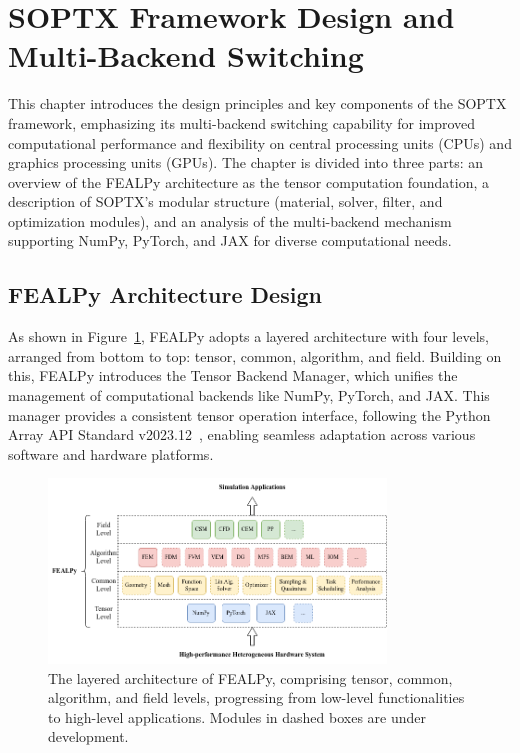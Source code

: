 \documentclass[mathpazo]{cicp}
\begin{document}
\section{SOPTX Framework Design and Multi-Backend Switching}
This chapter introduces the design principles and key components of the SOPTX framework, emphasizing its multi-backend switching capability for improved computational performance and flexibility on central processing units (CPUs) and graphics processing units (GPUs). The chapter is divided into three parts: an overview of the FEALPy architecture as the tensor computation foundation, a description of SOPTX’s modular structure (material, solver, filter, and optimization modules), and an analysis of the multi-backend mechanism supporting NumPy, PyTorch, and JAX for diverse computational needs.

\subsection{FEALPy Architecture Design}
As shown in Figure~\ref{fs:fig1}, FEALPy adopts a layered architecture with four levels, arranged from bottom to top: tensor, common, algorithm, and field. Building on this, FEALPy introduces the Tensor Backend Manager, which unifies the management of computational backends like NumPy, PyTorch, and JAX. This manager provides a consistent tensor operation interface, following the Python Array API Standard v2023.12~\cite{arrayapi2023}, enabling seamless adaptation across various software and hardware platforms.
\vspace{-0.5ex} %
\begin{figure}[htp]
	\centering
	\includegraphics[width=0.8\textwidth]{figures/fealpy_structure.png}
	\caption{The layered architecture of FEALPy, comprising tensor, common, algorithm, and field levels, progressing from low-level functionalities to high-level applications. Modules in dashed boxes are under development.}
	\label{fs:fig1}
\end{figure}
\vspace{-0.5ex} %
\end{document}
